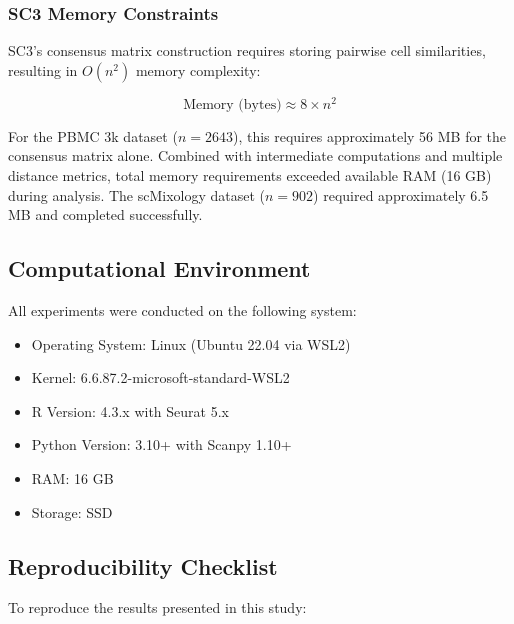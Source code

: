 \subsubsection{SC3 Memory Constraints}

SC3's consensus matrix construction requires storing pairwise cell similarities, resulting in $O(n^2)$ memory complexity:

\begin{equation}
\text{Memory (bytes)} \approx 8 \times n^2
\end{equation}

For the PBMC 3k dataset ($n = 2643$), this requires approximately 56 MB for the consensus matrix alone. Combined with intermediate computations and multiple distance metrics, total memory requirements exceeded available RAM (16 GB) during analysis. The scMixology dataset ($n = 902$) required approximately 6.5 MB and completed successfully.

\subsection{Computational Environment}

All experiments were conducted on the following system:
\begin{itemize}[noitemsep]
    \item Operating System: Linux (Ubuntu 22.04 via WSL2)
    \item Kernel: 6.6.87.2-microsoft-standard-WSL2
    \item R Version: 4.3.x with Seurat 5.x
    \item Python Version: 3.10+ with Scanpy 1.10+
    \item RAM: 16 GB
    \item Storage: SSD
\end{itemize}

\subsection{Reproducibility Checklist}

To reproduce the results presented in this study:


